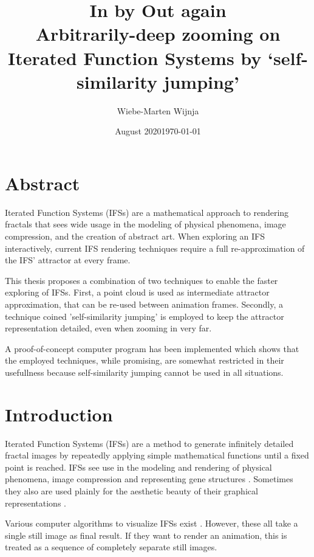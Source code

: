 \documentclass[11pt]{article}
\date{August 2020}
\author{Wiebe-Marten Wijnja}
\date{\today}
\title{\Huge In by Out again\\\medskip
\large Arbitrarily-deep zooming on Iterated Function Systems by `self-similarity jumping'}
\begin{document}
\maketitle
\setcounter{tocdepth}{4}
\tableofcontents

\listoftodos


\section{Abstract}
\label{sec:orgfc268e0}

Iterated Function Systems (IFSs) are a mathematical approach to rendering fractals that sees wide usage in the modeling of physical phenomena, 
image compression, and the creation of abstract art.
When exploring an IFS interactively, current IFS rendering techniques require a full re-approximation of the IFS' attractor at every frame.

This thesis proposes a combination of two techniques to enable the faster exploring of IFSs.
First, a point cloud is used as intermediate attractor approximation, that can be re-used between animation frames.
Secondly, a technique coined 'self-similarity jumping' is employed to keep the attractor representation detailed, even when zooming in very far.

A proof-of-concept computer program has been implemented
which shows that the employed techniques, while promising, 
are somewhat restricted in their usefullness because self-similarity jumping cannot be used in all situations.

\section{Introduction}
\label{sec:orgc7e62ce}

Iterated Function Systems (IFSs) are a method to generate infinitely detailed fractal images 
by repeatedly applying simple mathematical functions until a fixed point is reached. \cite{barnsley1988fractals}
IFSs see use in the modeling and rendering of physical phenomena, image compression \cite{hart1996fractal} and representing gene structures \cite{jeffrey1990chaos}.
Sometimes they also are used plainly for the aesthetic beauty of their graphical representations \cite{draves2003fractal}.

Various computer algorithms to visualize IFSs exist \cite{hepting1991rendering}.
However, these all take a single still image as final result. If they want to render an animation,
this is treated as a sequence of completely separate still images.
\end{document}
